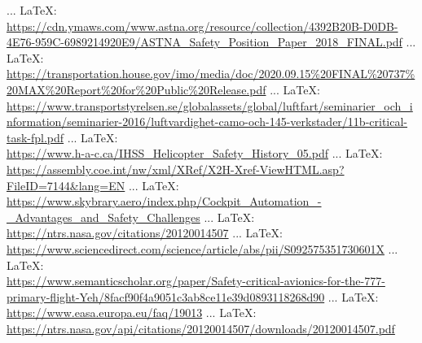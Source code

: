 \begin{thebibliography}{99}
{{{{{{ ... \LaTeX:\\ \url{https://cdn.ymaws.com/www.astna.org/resource/collection/4392B20B-D0DB-4E76-959C-6989214920E9/ASTNA_Safety_Position_Paper_2018_FINAL.pdf}
 ... \LaTeX:\\ \url{https://transportation.house.gov/imo/media/doc/2020.09.15%20FINAL%20737%20MAX%20Report%20for%20Public%20Release.pdf}
 ... \LaTeX:\\ \url{https://www.transportstyrelsen.se/globalassets/global/luftfart/seminarier_och_information/seminarier-2016/luftvardighet-camo-och-145-verkstader/11b-critical-task-fpl.pdf}
 ... \LaTeX:\\ \url{https://www.h-a-c.ca/IHSS_Helicopter_Safety_History_05.pdf}
 ... \LaTeX:\\ \url{https://assembly.coe.int/nw/xml/XRef/X2H-Xref-ViewHTML.asp?FileID=7144&lang=EN}
 ... \LaTeX:\\ \url{https://www.skybrary.aero/index.php/Cockpit_Automation_-_Advantages_and_Safety_Challenges}
 ... \LaTeX:\\ \url{https://ntrs.nasa.gov/citations/20120014507}
 ... \LaTeX:\\ \url{https://www.sciencedirect.com/science/article/abs/pii/S092575351730601X}
 ... \LaTeX:\\ \url{https://www.semanticscholar.org/paper/Safety-critical-avionics-for-the-777-primary-flight-Yeh/8facf90f4a9051c3ab8ce11e39d0893118268d90}
 ... \LaTeX:\\ \url{https://www.easa.europa.eu/faq/19013}
 ... \LaTeX:\\ \url{https://ntrs.nasa.gov/api/citations/20120014507/downloads/20120014507.pdf}
}}}}}}
\end{thebibliography}
